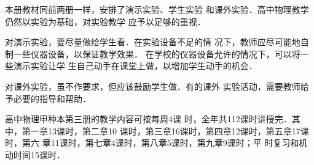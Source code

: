 本册教材同前两册一样，安排了演示实验、学生实验
和课外实验．高中物理教学仍然以实验为基础，对实验教学
应予以足够的重视．

对演示实验，要尽量做给学生看．在实验设备不足的情
况下，教师应尽可能地自制一些仪器设备，以保证教学效果．
在学校的仪器设备允许的情况下，可以将一些演示实验让学
生自己动手在课堂上做，以增加学生动手的机会．

对课外实验，虽不作要求，但应该鼓励学生做．有的课外
实验活动，需要教师给予必要的指导和帮助．

高中物理甲种本第三册的教学内容可按每周4课
时，全年共112课时讲授完．其中，第一章13课时，第二章10
课时，第三章16课时，第四章12课时，第五章17课时，第六
章11课时，第七章4课时，第八章5课时，第九章9课时；平
时复习和机动时间15课时．












